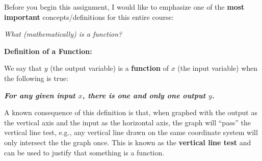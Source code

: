 \documentclass[addpoints, 12pt] {exam}
\begin{document}
\begin{center}
\end{center}
\vspace{0.1in}

Before you begin this assignment, I would like to emphasize one of the \textbf{most important} concepts/definitions for this entire course: 
\begin{center}
\emph{What (mathematically) is a function?}
\end{center}
\textbf{Definition of a Function:} 
\begin{center}
We say that \(y\) (the output variable) is a \textbf{function} of \(x\) (the input variable) when the following is true:

 \emph{\textbf{For any given input \(x\), there is one and only one output \(y\).}}
\vspace{0.5in}

\end{center}
A known consequence of this definition is that, when graphed with the output as the vertical axis and the input as the horizontal axis, the graph will ``pass'' the vertical line test, e.g., any vertical line drawn on the same coordinate system will only intersect the the graph once. This is known as the \textbf{vertical line test} and can be used to justify that something is a function.
\vspace{0.25in}
\end{document}
